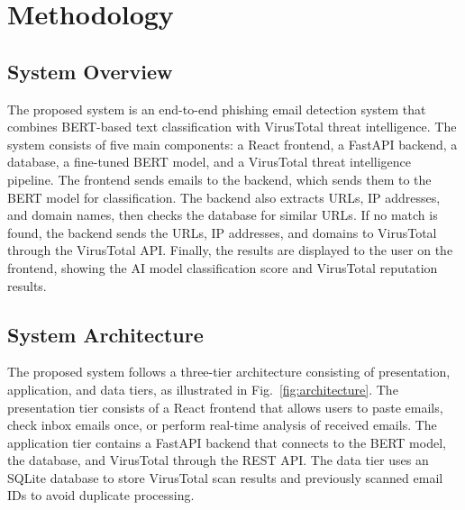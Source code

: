 \documentclass[conference]{IEEEtran}
\begin{document}
\section{Methodology}
\label{sec:method}

\subsection{System Overview}

The proposed system is an end-to-end phishing email detection
system that combines BERT-based text classification with VirusTotal
threat intelligence. The system consists of five main components:
a React frontend, a FastAPI backend, a database, a fine-tuned BERT
model, and a VirusTotal threat intelligence pipeline. The frontend
sends emails to the backend, which sends them to the BERT model
for classification. The backend also extracts URLs, IP addresses,
and domain names, then checks the database for similar URLs. If no
match is found, the backend sends the URLs, IP addresses, and
domains to VirusTotal through the VirusTotal API. Finally, the
results are displayed to the user on the frontend, showing the AI
model classification score and VirusTotal reputation results.

\subsection{System Architecture}

The proposed system follows a three-tier architecture consisting
of presentation, application, and data tiers, as illustrated in
Fig.~\ref{fig:architecture}. The presentation tier consists of a
React frontend that allows users to paste emails, check inbox
emails once, or perform real-time analysis of received emails. The
application tier contains a FastAPI backend that connects to the
BERT model, the database, and VirusTotal through the REST API. The
data tier uses an SQLite database to store VirusTotal scan results
and previously scanned email IDs to avoid duplicate processing.
\end{document}
